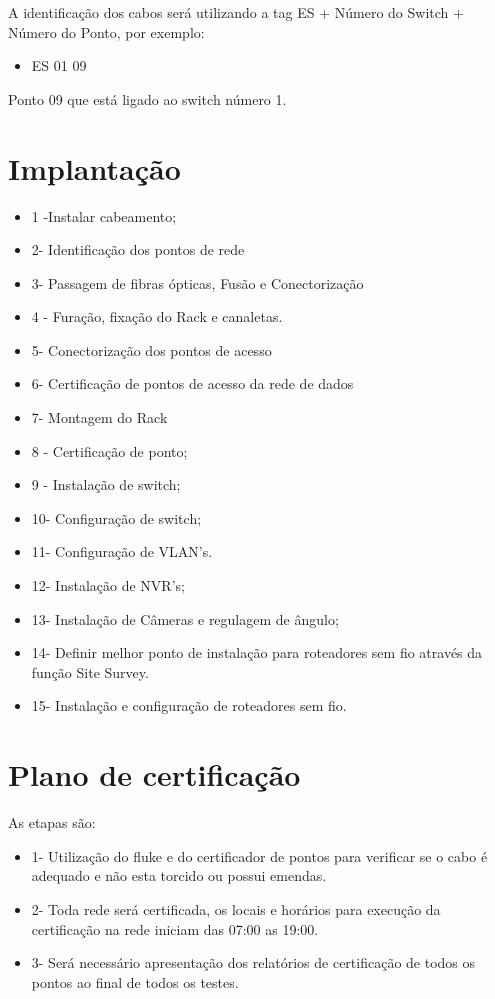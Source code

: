 \documentclass[	DIV=calc,%
							paper=a4,%
							fontsize=12pt,%
							onecolumn]{scrartcl}	 					%
\begin{document}
A identificação dos cabos será utilizando a tag ES + Número do Switch + Número do Ponto, por exemplo:
\begin{itemize}
\item ES 01 09
\end{itemize}
Ponto 09 que está ligado ao switch número 1.

\section{Implantação}
\begin{itemize}
\item 1 -Instalar cabeamento;
\item 2- Identificação dos pontos de rede
\item 3- Passagem de fibras ópticas, Fusão e Conectorização
\item 4 - Furação, fixação do Rack e canaletas.
\item 5- Conectorização dos pontos de acesso
\item 6- Certificação de pontos de acesso da rede de dados
\item 7- Montagem do Rack
\item 8 - Certificação de ponto;
\item 9 - Instalação de switch;
\item 10- Configuração de switch;
\item 11- Configuração de VLAN's.
\item 12- Instalação de NVR's;
\item 13- Instalação de Câmeras e regulagem de ângulo;
\item 14- Definir melhor ponto de instalação para roteadores sem fio através da função Site Survey.
\item 15- Instalação e configuração de roteadores sem fio.

\end{itemize}

\section{Plano de certificação}

As etapas são:
\begin{itemize}
\item 1- Utilização do fluke e do certificador de pontos para verificar se o cabo é adequado e não esta torcido ou possui emendas.  
\item 2- Toda rede será certificada, os locais e horários para execução da certificação na rede iniciam das 07:00 as 19:00.
\item 3- Será necessário apresentação dos relatórios de certificação de todos os pontos ao final de todos os testes.
\end{itemize}
\end{document}
